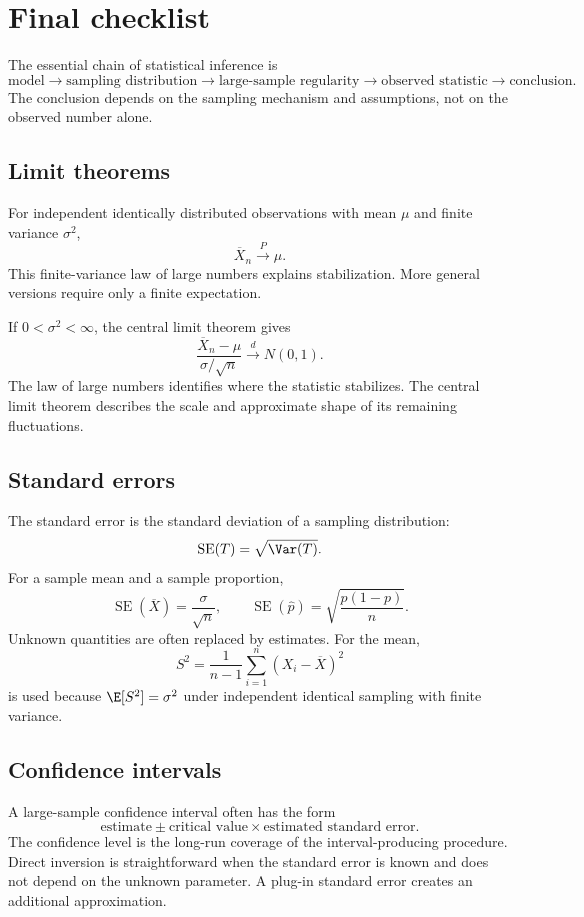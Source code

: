 \section{Final checklist}

The essential chain of statistical inference is
\[
\text{model}
\longrightarrow
\text{sampling distribution}
\longrightarrow
\text{large-sample regularity}
\longrightarrow
\text{observed statistic}
\longrightarrow
\text{conclusion}.
\]
The conclusion depends on the sampling mechanism and assumptions, not on the
observed number alone.

\subsection*{Limit theorems}

For independent identically distributed observations with mean \(\mu\) and finite
variance \(\sigma^2\),
\[
\overline X_n\xrightarrow{P}\mu.
\]
This finite-variance law of large numbers explains stabilization. More general
versions require only a finite expectation.

If \(0<\sigma^2<\infty\), the central limit theorem gives
\[
\frac{\overline X_n-\mu}{\sigma/\sqrt n}
\xrightarrow{d}N(0,1).
\]
The law of large numbers identifies where the statistic stabilizes. The central
limit theorem describes the scale and approximate shape of its remaining
fluctuations.

\subsection*{Standard errors}

The standard error is the standard deviation of a sampling distribution:
\[
\operatorname{SE}(T)=\sqrt{\Var(T)}.
\]
For a sample mean and a sample proportion,
\[
\operatorname{SE}(\overline X)=\frac{\sigma}{\sqrt n},
\qquad
\operatorname{SE}(\widehat p)=\sqrt{\frac{p(1-p)}{n}}.
\]
Unknown quantities are often replaced by estimates. For the mean,
\[
S^2=\frac1{n-1}\sum_{i=1}^n(X_i-\overline X)^2
\]
is used because \(\E[S^2]=\sigma^2\) under independent identical sampling with
finite variance.

\subsection*{Confidence intervals}

A large-sample confidence interval often has the form
\[
\text{estimate}
\pm
\text{critical value}\times\text{estimated standard error}.
\]
The confidence level is the long-run coverage of the interval-producing
procedure. Direct inversion is straightforward when the standard error is known
and does not depend on the unknown parameter. A plug-in standard error creates an
additional approximation.

